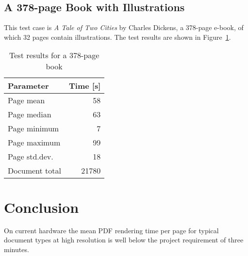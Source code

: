 \documentclass[a4paper,11pt]{article}
\begin{document}
\subsection{A 378-page Book with Illustrations}

This test case is \emph{A Tale of Two Cities} by Charles Dickens, a 378-page e-book, of which 32 pages contain illustrations.
The test results are shown in Figure~\ref{tab:378-page-doc}.

\begin{table}[htbp]
  \centering\small
  \begin{tabular}{@{}lr@{}}
    \hline
    Parameter      & Time [s] \\
    \hline
    Page mean      & 58    \\
    Page median    & 63    \\
    Page minimum   & 7     \\
    Page maximum   & 99    \\
    Page std.dev.  & 18    \\
    Document total & 21780 \\
    \hline
  \end{tabular}
  \caption{Test results for a 378-page book}
  \label{tab:378-page-doc}
\end{table}

\section{Conclusion}

On current hardware the mean PDF rendering time per page for typical document types at high resolution is well below the project requirement of three minutes.
\end{document}
